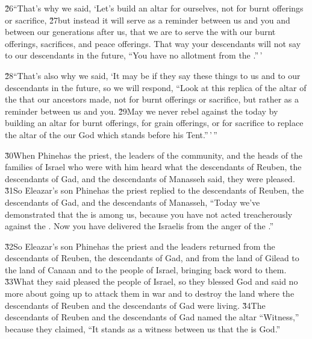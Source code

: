 \v{26}``That's why we said, `Let's build an altar for ourselves, not for burnt offerings or sacrifice, \v{27}but instead it will serve as a reminder between us and you and between our generations after us, that we are to serve the  with our burnt offerings, sacrifices, and peace offerings. That way your descendants will not say to our descendants in the future, ``You have no allotment from the .''\,'

\v{28}``That's also why we said, `It may be if they say these things to us and to our descendants in the future, so we will respond, ``Look at this replica of the altar of the  that our ancestors made, not for burnt offerings or sacrifice, but rather as a reminder between us and you. \v{29}May we never rebel against the  today by building an altar for burnt offerings, for grain offerings, or for sacrifice to replace the altar of the  our God which stands before his Tent.''\,'\,''

\v{30}When Phinehas the priest, the leaders of the community, and the heads of the families of Israel who were with him heard what the descendants of Reuben, the descendants of Gad, and the descendants of Manasseh said, they were pleased. \v{31}So Eleazar's son Phinehas the priest replied to the descendants of Reuben, the descendants of Gad, and the descendants of Manasseh, ``Today we've demonstrated that the  is among us, because you have not acted treacherously against the . Now you have delivered the Israelis from the anger of the .''

\v{32}So Eleazar's son Phinehas the priest and the leaders returned from the descendants of Reuben, the descendants of Gad, and from the land of Gilead to the land of Canaan and to the people of Israel, bringing back word to them. \v{33}What they said pleased the people of Israel, so they blessed God and said no more about going up to attack them in war and to destroy the land where the descendants of Reuben and the descendants of Gad were living. \v{34}The descendants of Reuben and the descendants of Gad named the altar ``Witness,'' because they claimed, ``It stands as a witness between us that the  is God.''

